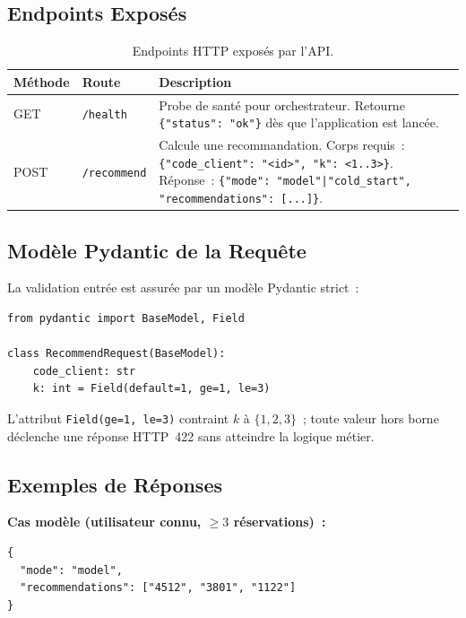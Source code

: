 \documentclass[11pt, a4paper]{article}
\begin{document}
\subsection{Endpoints Exposés}

\begin{table}[h]
\centering
\small
\begin{tabularx}{\textwidth}{|l|l|X|}
\hline
\textbf{Méthode} & \textbf{Route}      & \textbf{Description} \\
\hline
GET  & \texttt{/health}    &
  Probe de santé pour orchestrateur. Retourne
  \texttt{\{"status": "ok"\}} dès que l'application est lancée. \\
\hline
POST & \texttt{/recommend} &
  Calcule une recommandation. Corps requis~: \texttt{\{"code\_client":
  "<id>", "k": <1..3>\}}. Réponse~: \texttt{\{"mode":
  "model"|"cold\_start", "recommendations": [...]\}}. \\
\hline
\end{tabularx}
\caption{Endpoints HTTP exposés par l'API.}
\end{table}

\subsection{Modèle Pydantic de la Requête}

La validation entrée est assurée par un modèle Pydantic strict~:

\begin{lstlisting}[style=py, caption={Modèle Pydantic pour le corps de requête}]
from pydantic import BaseModel, Field

class RecommendRequest(BaseModel):
    code_client: str
    k: int = Field(default=1, ge=1, le=3)
\end{lstlisting}

L'attribut \texttt{Field(ge=1, le=3)} contraint $k$ à
$\{1, 2, 3\}$~; toute valeur hors borne déclenche une réponse HTTP~422
sans atteindre la logique métier.

\subsection{Exemples de Réponses}

\textbf{Cas modèle (utilisateur connu, $\geq 3$ réservations)~:}
\begin{lstlisting}[style=jn]
{
  "mode": "model",
  "recommendations": ["4512", "3801", "1122"]
}
\end{lstlisting}
\end{document}
